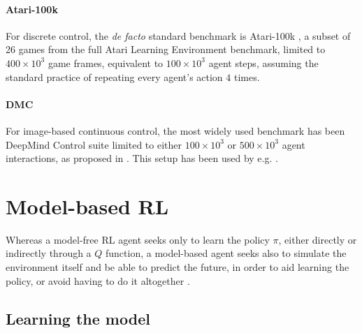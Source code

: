 \documentclass[en]{pracamgr}
\begin{document}
\paragraph{Atari-100k} For discrete control, the \emph{de facto} standard benchmark is Atari-100k \autocite{kaiserModelBasedReinforcementLearning2024}, a subset of 26 games from the full Atari Learning Environment \autocite{bellemareArcadeLearningEnvironment2013} benchmark, limited to $400\times 10^3$ game frames, equivalent to $100 \times 10^3$ agent steps, assuming the standard practice of repeating every agent's action $4$ times.

\paragraph{DMC} For image-based continuous control, the most widely used benchmark has been DeepMind Control suite \autocite{tassaDeepMindControlSuite2018} limited to either $100 \times 10^3$ or $500 \times 10^3$ agent interactions, as proposed in \autocite{kaiserModelBasedReinforcementLearning2024}. This setup has been used by e.g. \autocite{kostrikovImageAugmentationAll2021,srinivasCURLContrastiveUnsupervised2020}.

\section{Model-based RL}

Whereas a model-free RL agent seeks only to learn the policy $\pi$, either directly or indirectly through a $Q$ function, a model-based agent seeks also to simulate the environment itself and be able to predict the future, in order to aid learning the policy, or avoid having to do it altogether \autocite{sutton2018reinforcement}.

\subsection{Learning the model}
\end{document}
